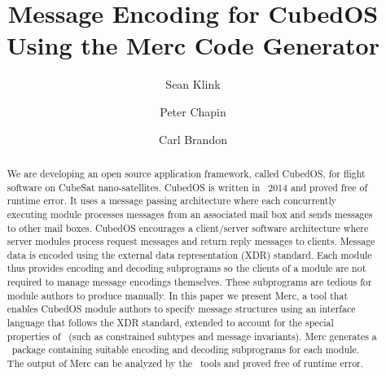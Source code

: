 \documentclass{llncs}
\begin{document}
\title{Message Encoding for CubedOS Using the Merc Code Generator}
\author{Sean Klink \and Peter Chapin \and Carl Brandon }


\maketitle

\begin{abstract}

  We are developing an open source application framework, called CubedOS, for flight software on
  CubeSat nano-satellites. CubedOS is written in \SPARK\ 2014 and proved free of runtime error.
  It uses a message passing architecture where each concurrently executing module processes
  messages from an associated mail box and sends messages to other mail boxes. CubedOS
  encourages a client/server software architecture where server modules process request messages
  and return reply messages to clients. Message data is encoded using the external data
  representation (XDR) standard. Each module thus provides encoding and decoding subprograms so
  the clients of a module are not required to manage message encodings themselves. These
  subprograms are tedious for module authors to produce manually. In this paper we present Merc,
  a tool that enables CubedOS module authors to specify message structures using an interface
  language that follows the XDR standard, extended to account for the special properties of
  \SPARK\ (such as constrained subtypes and message invariants). Merc generates a \SPARK\
  package containing suitable encoding and decoding subprograms for each module. The output of
  Merc can be analyzed by the \SPARK\ tools and proved free of runtime error.

\end{abstract}









\end{document}
